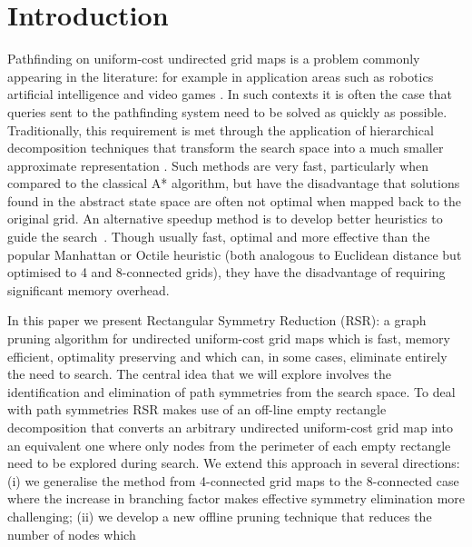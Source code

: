 \section{Introduction}
\label{sec:introduction}

Pathfinding on uniform-cost undirected grid maps is a problem commonly appearing in
the literature: for example in application areas such as robotics \cite{lee09}
artificial intelligence \cite{wang09} and video games \cite{davis00}.  
In such contexts it is often the
case that queries sent to the pathfinding system need to be solved as quickly as
possible.  Traditionally, this requirement is met through the application of
hierarchical decomposition techniques that transform the search space into a
much smaller approximate representation \cite{botea04,sturtevant10}.
Such methods are very fast, particularly when compared to the classical A*
algorithm, but have the disadvantage that solutions found in the abstract state
space are often not optimal when mapped back to the original grid.  An
alternative speedup method is to develop better heuristics to guide the
search~\cite{bjornsson06,sturtevant09,goldenberg10}.  Though usually
fast, optimal and more effective than the popular Manhattan or Octile heuristic (both
analogous to Euclidean distance but optimised to 4 and 8-connected grids), they
have the disadvantage of requiring significant memory overhead.
\par
In this paper we present Rectangular Symmetry Reduction (RSR): a graph pruning
algorithm for undirected uniform-cost grid maps which is fast, memory efficient,
optimality preserving and which can, in some cases, eliminate entirely the need
to search.  The central idea that we will explore involves the identification
and elimination of path symmetries from the search space. 
To deal with path symmetries RSR makes use of an off-line
empty rectangle decomposition \cite{harabor10} that converts an arbitrary
undirected uniform-cost grid map into an equivalent one where only nodes
from the perimeter of each empty rectangle need to be explored during search.
We extend this approach in several directions: (i) we generalise the method
from 4-connected grid maps to the 8-connected case where the increase in
branching factor makes effective symmetry elimination more challenging; (ii) we
develop a new offline pruning technique that reduces the number of nodes which
